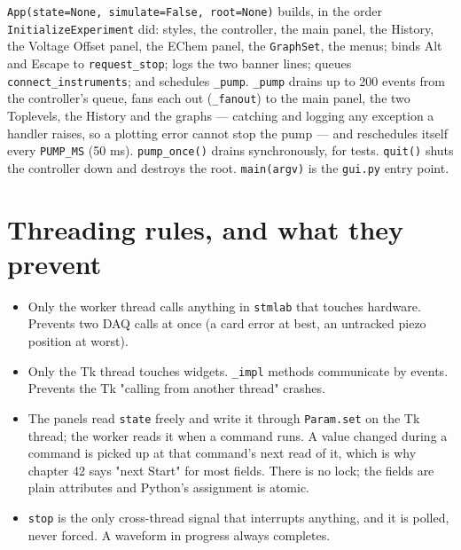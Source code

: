 \texttt{App(state=None,\discretionary{}{}{} simulate=False,\discretionary{}{}{} root=None)} builds, in the order \texttt{Initialize\discretionary{}{}{}Experiment} did: styles, the controller, the main panel, the History, the Voltage Offset panel, the EChem panel, the \texttt{Graph\discretionary{}{}{}Set}, the menus; binds Alt and Escape to \texttt{request\_\discretionary{}{}{}stop}; logs the two banner lines; queues \texttt{connect\_\discretionary{}{}{}instruments}; and schedules \texttt{\_\discretionary{}{}{}pump}. \texttt{\_\discretionary{}{}{}pump} drains up to 200 events from the controller's queue, fans each out (\texttt{\_\discretionary{}{}{}fanout}) to the main panel, the two Toplevels, the History and the graphs --- catching and logging any exception a handler raises, so a plotting error cannot stop the pump --- and reschedules itself every \texttt{PUMP\_\discretionary{}{}{}MS} (50 ms). \texttt{pump\_\discretionary{}{}{}once()} drains synchronously, for tests. \texttt{quit()} shuts the controller down and destroys the root. \texttt{main(argv)} is the \texttt{gui.\discretionary{}{}{}py} entry point.

\section{Threading rules, and what they prevent}

\begin{itemize}[leftmargin=*]
\item Only the worker thread calls anything in \texttt{stmlab} that touches hardware. Prevents two DAQ calls at once (a card error at best, an untracked piezo position at worst).
\item Only the Tk thread touches widgets. \texttt{\_\discretionary{}{}{}impl} methods communicate by events. Prevents the Tk "calling from another thread" crashes.
\item The panels read \texttt{state} freely and write it through \texttt{Param.\discretionary{}{}{}set} on the Tk thread; the worker reads it when a command runs. A value changed during a command is picked up at that command's next read of it, which is why chapter 42 says "next Start" for most fields. There is no lock; the fields are plain attributes and Python's assignment is atomic.
\item \texttt{stop} is the only cross-thread signal that interrupts anything, and it is polled, never forced. A waveform in progress always completes.
\end{itemize}

